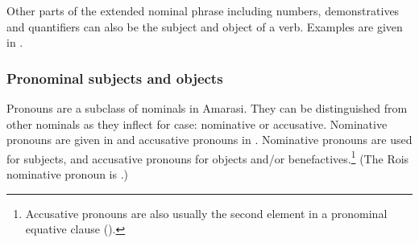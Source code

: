 \begin{exe}
		\label{ex:120715-4, 0.45}
	\label{ex:140726, 0.00}
\end{exe}

Other parts of the extended nominal phrase including numbers,
demonstratives and quantifiers can also be the subject and object of a verb.
Examples are given in .

\subsubsection{Pronominal subjects and objects}\label{sec:ProArg}
Pronouns are a subclass of nominals in Amarasi.
They can be distinguished from other nominals
as they inflect for case: nominative or accusative.
Nominative pronouns are given in 
and accusative pronouns in .
Nominative pronouns are used for subjects,
and accusative pronouns for objects and/or benefactives.\footnote{
		Accusative pronouns are also usually the second element in 
		a pronominal equative clause ().}
(The Ro{\Q}is  nominative pronoun is .)

